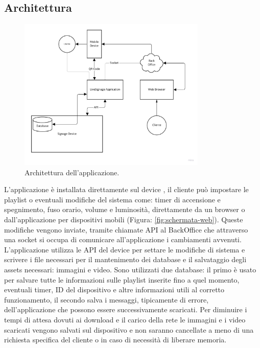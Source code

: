 \subsection{Architettura}
\begin{figure}[!htb]
    \centering
    \includegraphics[width= 0.8\textwidth]{images/Introduzione/architettura.jpg} 
    \caption{Architettura dell'applicazione.} 
    \label{fig:architettura}
\end{figure}


L'applicazione è installata direttamente sul device , il cliente può impostare le playlist o eventuali modifiche del sistema come: timer di accensione e spegnimento, fuso orario, volume e luminosità, direttamente da un browser o dall'applicazione per dispositivi mobili (Figura: \ref*{fig:schermata-web}). \nl
Queste modifiche vengono inviate, tramite chiamate API al BackOffice che attraverso una socket si occupa di comunicare all'applicazione i cambiamenti avvenuti. 
L'applicazione utilizza le API del device per settare le modifiche di sistema e scrivere i file necessari per il mantenimento dei database e il salvataggio degli assets necessari: immagini e video. \n
Sono utilizzati due database: il primo è usato per salvare tutte le informazioni sulle playlist inserite fino a quel momento, eventuali timer, ID del dispositivo e altre informazioni utili al corretto funzionamento, il secondo salva i messaggi, tipicamente di errore, dell'applicazione che possono essere successivamente scaricati.\n
Per diminuire i tempi di attesa dovuti ai download e il carico della rete le immagini e i video scaricati vengono salvati sul dispositivo e non saranno cancellate a meno di una richiesta specifica del cliente o in caso di necessità di liberare memoria.\n

